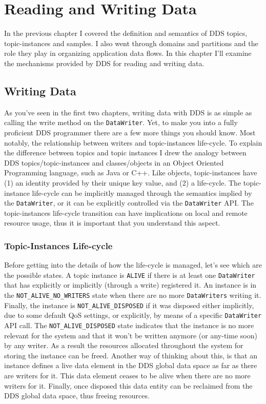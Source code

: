 \chapter{Reading and Writing Data}\label{Chapter:Read:Write:Data}  
In the previous chapter I covered the definition and semantics of DDS topics, 
topic-instances and samples. I also went through domains and partitions 
and the role they play in organizing application data flows. 
In this chapter I'll examine the mechanisms provided by DDS for 
reading and writing data. 

\section{Writing Data}\label{Section:Writing:Data} 
As you've seen in the first two chapters, writing data 
with \ac{DDS} is as simple as calling the write method on the 
\texttt{DataWriter}. Yet, to make you into a fully proficient \ac{DDS} 
programmer there are a few more things you should know. 
Most notably, the relationship between writers and topic-instances life-cycle.
To explain the difference between topics and topic instances I drew the 
analogy between \ac{DDS} topics/topic-instances and classes/objects in an 
Object Oriented Programming language, such as Java or C++. Like objects,  
topic-instances have (1) an identity provided by their unique key value, 
and (2) a life-cycle. The topic-instance life-cycle can be implicitly 
managed through the semantics implied by the \texttt{DataWriter}, or it 
can be explicitly controlled via the \texttt{DataWriter} API.
The topic-instances life-cycle transition can have implications on 
local and remote resource usage, thus it is important that you understand 
this aspect.

\subsection{Topic-Instances Life-cycle}  
Before getting into the details of how the life-cycle is managed, 
let's see which are the possible states. A topic instance is 
\texttt{ALIVE} if there is at least one \texttt{DataWriter} that has
explicitly or implicitly (through a write) registered it.
An instance is in the \texttt{NOT\_ALIVE\_NO\_WRITERS} 
state when there are no more \texttt{DataWriters} writing it. 
Finally, the instance is \texttt{NOT\_ALIVE\_DISPOSED} 
if it was disposed either implicitly, due to some default \ac{QoS} 
settings, or explicitly, by means of a specific \texttt{DataWriter}
API call. The \texttt{NOT\_ALIVE\_DISPOSED} state indicates that the 
instance is no more relevant for the system and that it won't be 
written anymore (or any-time soon) by any writer.  
As a result the resources allocated throughout the system for storing 
the instance can be freed.  Another way of thinking about this, 
is that an instance defines a live data element in the \ac{DDS} global 
data space as far as there are writers for it. This data element ceases 
to be alive when there are no more writers for it. Finally, once 
disposed this data entity can be reclaimed from the \ac{DDS} global 
data space, thus freeing resources.  

